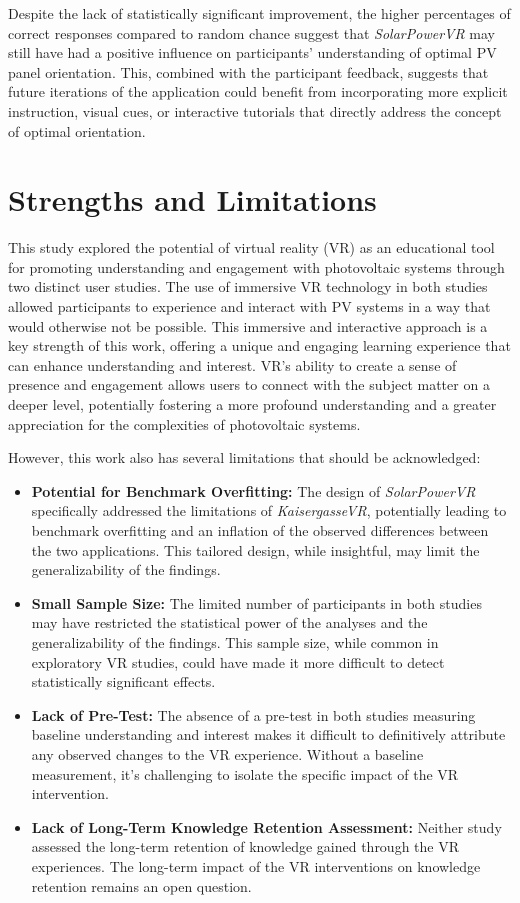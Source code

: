 \documentclass[draft, final]{vutinfth} %
\begin{document}
Despite the lack of statistically significant improvement, the higher percentages of correct responses compared to random chance suggest that \textit{SolarPowerVR} may still have had a positive influence on participants' understanding of optimal PV panel orientation. This, combined with the participant feedback, suggests that future iterations of the application could benefit from incorporating more explicit instruction, visual cues, or interactive tutorials that directly address the concept of optimal orientation.

\section{Strengths and Limitations}

This study explored the potential of virtual reality (VR) as an educational tool for promoting understanding and engagement with photovoltaic systems through two distinct user studies. The use of immersive VR technology in both studies allowed participants to experience and interact with PV systems in a way that would otherwise not be possible. This immersive and interactive approach is a key strength of this work, offering a unique and engaging learning experience that can enhance understanding and interest. VR's ability to create a sense of presence and engagement \cite{Winn2002Immersion, HuAu2018VrExperience} allows users to connect with the subject matter on a deeper level, potentially fostering a more profound understanding and a greater appreciation for the complexities of photovoltaic systems.

However, this work also has several limitations that should be acknowledged:

\begin{itemize}
    \item \textbf{Potential for Benchmark Overfitting:} The design of \textit{SolarPowerVR} specifically addressed the limitations of \textit{KaisergasseVR}, potentially leading to benchmark overfitting and an inflation of the observed differences between the two applications. This tailored design, while insightful, may limit the generalizability of the findings.
    \item \textbf{Small Sample Size:} The limited number of participants in both studies may have restricted the statistical power of the analyses and the generalizability of the findings. This sample size, while common in exploratory VR studies, could have made it more difficult to detect statistically significant effects. 
    \item \textbf{Lack of Pre-Test:} The absence of a pre-test in both studies measuring baseline understanding and interest makes it difficult to definitively attribute any observed changes to the VR experience. Without a baseline measurement, it's challenging to isolate the specific impact of the VR intervention.
    \item \textbf{Lack of Long-Term Knowledge Retention Assessment:} Neither study assessed the long-term retention of knowledge gained through the VR experiences. The long-term impact of the VR interventions on knowledge retention remains an open question.
\end{itemize}
\end{document}
